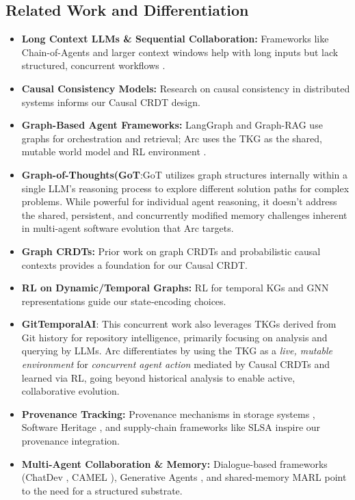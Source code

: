 \documentclass{article}
\begin{document}
\subsection{Related Work and Differentiation}
\begin{itemize}
  \item \textbf{Long Context LLMs \& Sequential Collaboration:} Frameworks like Chain-of-Agents \cite{ref11} and larger context windows help with long inputs but lack structured, concurrent workflows \cite{ref12,ref13}.
  \item \textbf{Causal Consistency Models:} Research on causal consistency in distributed systems \cite{ref14,ref15,ref24} informs our Causal CRDT design.
  \item \textbf{Graph-Based Agent Frameworks:} LangGraph \cite{ref18,ref19} and Graph-RAG \cite{ref20,ref21} use graphs for orchestration and retrieval; Arc uses the TKG as the shared, mutable world model and RL environment \cite{ref39}.
  \item \textbf{Graph-of-Thoughts(GoT}:GoT \cite{ref39} utilizes graph structures internally within a single LLM's reasoning process to explore different solution paths for complex problems. While powerful for individual agent reasoning, it doesn't address the shared, persistent, and concurrently modified memory challenges inherent in multi-agent software evolution that Arc targets.
  \item \textbf{Graph CRDTs:} Prior work on graph CRDTs and probabilistic causal contexts \cite{ref5,ref6,ref50} provides a foundation for our Causal CRDT.
  \item \textbf{RL on Dynamic/Temporal Graphs:} RL for temporal KGs \cite{ref46,ref47} and GNN representations \cite{ref15,ref31,ref36} guide our state‐encoding choices.
  \item \textbf{GitTemporalAI}: This concurrent work \cite{ref37} also leverages TKGs derived from Git history for repository intelligence, primarily focusing on analysis and querying by LLMs. Arc differentiates by using the TKG as a \textit{live, mutable environment} for \textit{concurrent agent action} mediated by Causal CRDTs and learned via RL, going beyond historical analysis to enable active, collaborative evolution.
  \item \textbf{Provenance Tracking:} Provenance mechanisms in storage systems \cite{ref16,ref17,ref27}, Software Heritage \cite{ref49}, and supply-chain frameworks like SLSA \cite{ref29,ref30} inspire our provenance integration.
  \item \textbf{Multi-Agent Collaboration \& Memory:} Dialogue-based frameworks (ChatDev \cite{ref43}, CAMEL \cite{ref44}), Generative Agents \cite{ref41}, and shared-memory MARL \cite{ref45, ref_srmt_arxiv} point to the need for a structured substrate.
\end{itemize}
\end{document}
